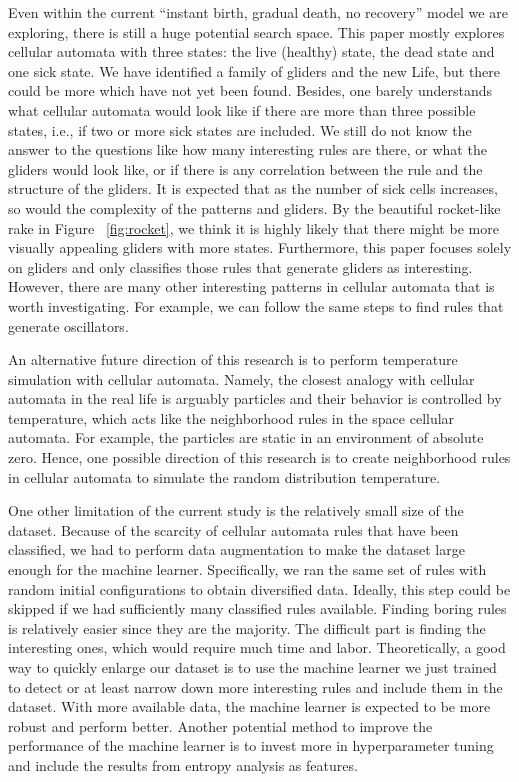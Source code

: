 \documentclass[12pt]{article}
\numberwithin{figure}{section} %
\begin{document}
Even within the current “instant birth, gradual death, no recovery” model we are exploring, there is still a huge potential search space. This paper mostly explores cellular automata with three states: the live (healthy) state, the dead state and one sick state. We have identified a family of gliders and the new Life, but there could be more which have not yet been found. Besides, one barely understands what cellular automata would look like if there are more than three possible states, i.e., if two or more sick states are included. We still do not know the answer to the questions like how many interesting rules are there, or what the gliders would look like, or if there is any correlation between the rule and the structure of the gliders. It is expected that as the number of sick cells increases, so would the complexity of the patterns and gliders. By the beautiful rocket-like rake in Figure ~\ref{fig:rocket}, we think it is highly likely that there might be more visually appealing gliders with more states. Furthermore, this paper focuses solely on gliders and only classifies those rules that generate gliders as interesting. However, there are many other interesting patterns in cellular automata that is worth investigating. For example, we can follow the same steps to find rules that generate oscillators. 

An alternative future direction of this research is to perform temperature simulation with cellular automata. Namely, the closest analogy with cellular automata in the real life is arguably particles and their behavior is controlled by temperature, which acts like the neighborhood rules in the space cellular automata. For example, the particles are static in an environment of absolute zero. Hence, one possible direction of this research is to create neighborhood rules in cellular automata to simulate the random distribution temperature. 

One other limitation of the current study is the relatively small size of the dataset. Because of the scarcity of cellular automata rules that have been classified, we had to perform data augmentation to make the dataset large enough for the machine learner. Specifically, we ran the same set of rules with random initial configurations to obtain diversified data. Ideally, this step could be skipped if we had sufficiently many classified rules available. Finding boring rules is relatively easier since they are the majority. The difficult part is finding the interesting ones, which would require much time and labor. Theoretically, a good way to quickly enlarge our dataset is to use the machine learner we just trained to detect or at least narrow down more interesting rules and include them in the dataset. With more available data, the machine learner is expected to be more robust and perform better. Another potential method to improve the performance of the machine learner is to invest more in hyperparameter tuning and include the results from entropy analysis as features. 
\end{document}
